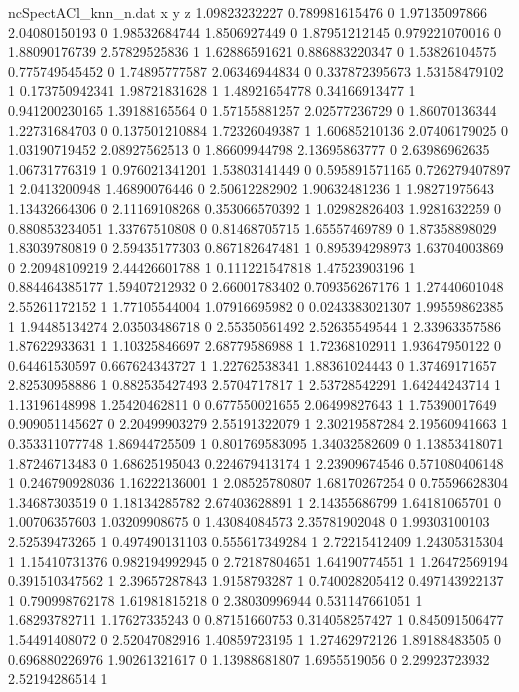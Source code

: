 \begin{filecontents}{ncSpectACl_knn_n.dat}
x y z
1.09823232227 0.789981615476 0
1.97135097866 2.04080150193 0
1.98532684744 1.8506927449 0
1.87951212145 0.979221070016 0
1.88090176739 2.57829525836 1
1.62886591621 0.886883220347 0
1.53826104575 0.775749545452 0
1.74895777587 2.06346944834 0
0.337872395673 1.53158479102 1
0.173750942341 1.98721831628 1
1.48921654778 0.34166913477 1
0.941200230165 1.39188165564 0
1.57155881257 2.02577236729 0
1.86070136344 1.22731684703 0
0.137501210884 1.72326049387 1
1.60685210136 2.07406179025 0
1.03190719452 2.08927562513 0
1.86609944798 2.13695863777 0
2.63986962635 1.06731776319 1
0.976021341201 1.53803141449 0
0.595891571165 0.726279407897 1
2.0413200948 1.46890076446 0
2.50612282902 1.90632481236 1
1.98271975643 1.13432664306 0
2.11169108268 0.353066570392 1
1.02982826403 1.9281632259 0
0.880853234051 1.33767510808 0
0.81468705715 1.65557469789 0
1.87358898029 1.83039780819 0
2.59435177303 0.867182647481 1
0.895394298973 1.63704003869 0
2.20948109219 2.44426601788 1
0.111221547818 1.47523903196 1
0.884464385177 1.59407212932 0
2.66001783402 0.709356267176 1
1.27440601048 2.55261172152 1
1.77105544004 1.07916695982 0
0.0243383021307 1.99559862385 1
1.94485134274 2.03503486718 0
2.55350561492 2.52635549544 1
2.33963357586 1.87622933631 1
1.10325846697 2.68779586988 1
1.72368102911 1.93647950122 0
0.64461530597 0.667624343727 1
1.22762538341 1.88361024443 0
1.37469171657 2.82530958886 1
0.882535427493 2.5704717817 1
2.53728542291 1.64244243714 1
1.13196148998 1.25420462811 0
0.677550021655 2.06499827643 1
1.75390017649 0.909051145627 0
2.20499903279 2.55191322079 1
2.30219587284 2.19560941663 1
0.353311077748 1.86944725509 1
0.801769583095 1.34032582609 0
1.13853418071 1.87246713483 0
1.68625195043 0.224679413174 1
2.23909674546 0.571080406148 1
0.246790928036 1.16222136001 1
2.08525780807 1.68170267254 0
0.75596628304 1.34687303519 0
1.18134285782 2.67403628891 1
2.14355686799 1.64181065701 0
1.00706357603 1.03209908675 0
1.43084084573 2.35781902048 0
1.99303100103 2.52539473265 1
0.497490131103 0.555617349284 1
2.72215412409 1.24305315304 1
1.15410731376 0.982194992945 0
2.72187804651 1.64190774551 1
1.26472569194 0.391510347562 1
2.39657287843 1.9158793287 1
0.740028205412 0.497143922137 1
0.790998762178 1.61981815218 0
2.38030996944 0.531147661051 1
1.68293782711 1.17627335243 0
0.87151660753 0.314058257427 1
0.845091506477 1.54491408072 0
2.52047082916 1.40859723195 1
1.27462972126 1.89188483505 0
0.696880226976 1.90261321617 0
1.13988681807 1.6955519056 0
2.29923723932 2.52194286514 1

\end{filecontents}
